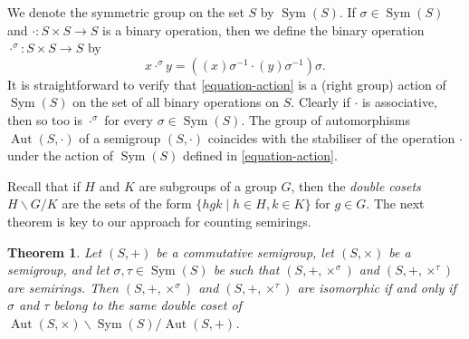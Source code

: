 \documentclass{article}
\theoremstyle{definition}
\theoremstyle{plain}
\newtheorem{theorem}[defn]{Theorem}
\newcommand{\Sym}{\operatorname{Sym}}
\newcommand{\Aut}{\operatorname{Aut}}
\begin{document}
We denote the symmetric group on the set $S$ by $\Sym(S)$.
If $\sigma\in \Sym(S)$ and
$\cdot: S \times S \to S$ is a binary operation, then we define the binary
operation $\cdot ^ \sigma: S\times S \to S$ by
\begin{equation}\label{equation-action}
  x \cdot ^ \sigma y = ((x)\sigma^{-1} \cdot (y)\sigma ^ {-1})\sigma.
\end{equation}
It is straightforward to verify that \eqref{equation-action} is a (right group)
action of $\Sym(S)$ on the set of all binary operations on $S$. Clearly if
$\cdot$ is associative, then so too is $\cdot ^ \sigma$ for every $\sigma \in
\Sym(S)$. The group of automorphisms $\Aut(S,\cdot)$ of a
semigroup $(S, \cdot)$ coincides with the stabiliser of the operation $\cdot$
under the action of $\Sym(S)$ defined in \eqref{equation-action}.

Recall that if $H$ and $K$ are subgroups of a group $G$, then the
\textit{double cosets} $H\backslash G / K$ are the sets of the form
$\{hgk\mid h\in H, k \in K\}$ for $g\in G$.
The next theorem is key to our approach for counting semirings.

\begin{theorem}
  \label{thm:isomorphism-condition}
  Let \((S, +)\) be a commutative semigroup, let \((S, \times)\) be a semigroup,
  and let \(\sigma, \tau\in\Sym(S)\) be such that $(S, +, \times ^ \sigma)$ and
  $(S, +, \times ^ \tau)$ are semirings.
  Then \((S, +, \times ^ \sigma)\) and \((S, +, \times^\tau)\) are isomorphic
  if and only if \(\sigma\) and \(\tau\) belong to the same double coset of
  \(\Aut(S, \times) \backslash \Sym(S) / \Aut(S, +)\).
\end{theorem}
\end{document}

